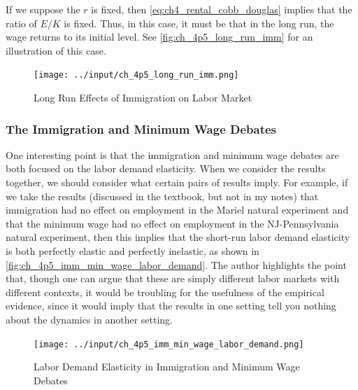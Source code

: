 If we suppose the $r$ is fixed, then \eqref{eq:ch4_rental_cobb_douglas}
implies that the ratio of $E/K$ is fixed.
Thus, in this case, it must be that in the long run, 
the wage returns to its initial level.
See \autoref{fig:ch_4p5_long_run_imm}
for an illustration of this case.

\FloatBarrier

\begin{figure}[!htb]
    \centering
        \texttt{[image: ../input/ch\_4p5\_long\_run\_imm.png]}
    \caption{Long Run Effects of Immigration on Labor Market}
    \label{fig:ch_4p5_long_run_imm}
\end{figure}

\FloatBarrier

\subsubsection{The Immigration and Minimum Wage Debates}

One interesting point is that the 
immigration and minimum wage debates are both 
focused on the labor demand elasticity.
When we consider the results together, we should 
consider what certain pairs of results imply. 
For example, if we take the results (discussed in the 
textbook, but not in my notes) that 
immigration had no effect on employment in the 
Mariel natural experiment and that 
the minimum wage had no effect on employment in the 
NJ-Pennsylvania natural experiment, 
then this implies that the short-run labor demand elasticity is
both perfectly elastic and perfectly inelastic,
as shown in \autoref{fig:ch_4p5_imm_min_wage_labor_demand}.
The author highlights the point that, though one can argue that 
these are simply different labor markets with different contexts, 
it would be troubling for the usefulness of
the empirical evidence, since it would imply that 
the results in one setting tell you nothing about the 
dynamics in 
another setting.


\FloatBarrier

\begin{figure}[!htb]
    \centering
        \texttt{[image: ../input/ch\_4p5\_imm\_min\_wage\_labor\_demand.png]}
    \caption{Labor Demand Elasticity in Immigration and Minimum Wage Debates}
    \label{fig:ch_4p5_imm_min_wage_labor_demand}
\end{figure}

\FloatBarrier

